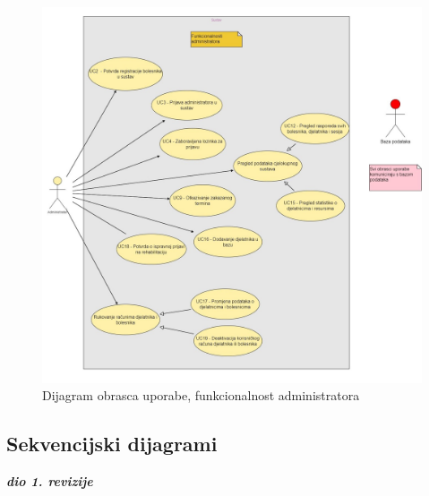 \documentclass[12pt]{report}
\begin{document}
\begin{figure}[p]
    \centering
    \includegraphics[width=\textwidth]{./slike/UC Dijagram - Administrator} 
    \caption{Dijagram obrasca uporabe, funkcionalnost administratora}
    \label{fig:my_image}
\end{figure}
\eject

\subsection{Sekvencijski dijagrami}

\textbf{\textit{dio 1. revizije}}\\
\end{document}
